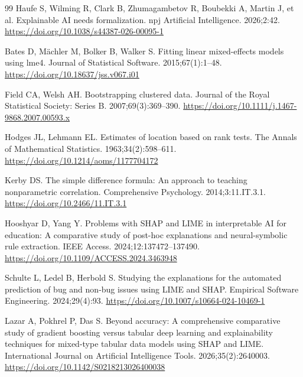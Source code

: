 \documentclass[11pt,a4paper]{article}
\begin{document}
\begin{thebibliography}{99}
Haufe S, Wilming R, Clark B, Zhumagambetov R, Boubekki A, Martin J, et al.
Explainable AI needs formalization. npj Artificial Intelligence. 2026;2:42.
\url{https://doi.org/10.1038/s44387-026-00095-1}


Bates D, M\"{a}chler M, Bolker B, Walker S. Fitting linear mixed-effects
models using lme4. Journal of Statistical Software. 2015;67(1):1--48.
\url{https://doi.org/10.18637/jss.v067.i01}

Field CA, Welsh AH. Bootstrapping clustered data. Journal of the Royal
Statistical Society: Series B. 2007;69(3):369--390.
\url{https://doi.org/10.1111/j.1467-9868.2007.00593.x}

Hodges JL, Lehmann EL. Estimates of location based on rank tests. The Annals
of Mathematical Statistics. 1963;34(2):598--611.
\url{https://doi.org/10.1214/aoms/1177704172}

Kerby DS. The simple difference formula: An approach to teaching
nonparametric correlation. Comprehensive Psychology. 2014;3:11.IT.3.1.
\url{https://doi.org/10.2466/11.IT.3.1}


Hooshyar D, Yang Y. Problems with SHAP and LIME in interpretable AI for
education: A comparative study of post-hoc explanations and neural-symbolic
rule extraction. IEEE Access. 2024;12:137472--137490.
\url{https://doi.org/10.1109/ACCESS.2024.3463948}

Schulte L, Ledel B, Herbold S. Studying the explanations for the automated
prediction of bug and non-bug issues using LIME and SHAP. Empirical Software
Engineering. 2024;29(4):93. \url{https://doi.org/10.1007/s10664-024-10469-1}

Lazar A, Pokhrel P, Das S. Beyond accuracy: A comprehensive comparative study
of gradient boosting versus tabular deep learning and explainability techniques
for mixed-type tabular data models using SHAP and LIME. International Journal
on Artificial Intelligence Tools. 2026;35(2):2640003.
\url{https://doi.org/10.1142/S0218213026400038}


\end{thebibliography}
\end{document}
